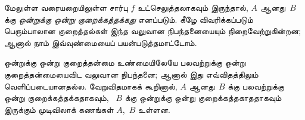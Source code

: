 \documentclass[../../../include/open-logic-section]{subfiles}
\begin{document}
மேலுள்ள வரையறையிலுள்ள சார்பு $f$ உட்செலுத்தலாகவும் இருந்தால்,
$A$ ஆனது~$B$ க்கு \emph{ஒன்றுக்கு ஒன்று குறைக்கத்தக்கது} எனப்படும்.
கீழே விவரிக்கப்படும் பெரும்பாலான குறைத்தல்கள் இந்த வலுவான
நிபந்தனையையும் நிறைவேற்றுகின்றன; ஆனால் நாம் இவ்வுண்மையைப்
பயன்படுத்தமாட்டோம்.

\begin{digress}
ஒன்றுக்கு ஒன்று குறைத்தன்மை உண்மையிலேயே பலவற்றுக்கு ஒன்று
குறைத்தன்மையைவிட வலுவான நிபந்தனை; ஆனால் இது எவ்விதத்திலும்
வெளிப்படையானதல்ல. வேறுவிதமாகக் கூறினால், $A$ ஆனது~$B$ க்கு
பலவற்றுக்கு ஒன்று குறைக்கத்தக்கதாகவும், ~$B$ க்கு ஒன்றுக்கு ஒன்று
குறைக்கத்தகாததாகவும் இருக்கும் முடிவிலாக் கணங்கள் $A$,~$B$ உள்ளன.
\end{digress}
\end{document}
